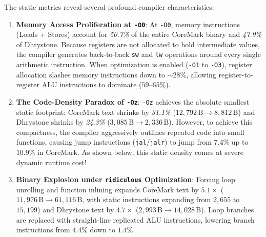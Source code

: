The static metrics reveal several profound compiler characteristics:
\begin{enumerate}
    \item \textbf{Memory Access Proliferation at \texttt{-O0}}:
    At \texttt{-O0}, memory instructions (Loads + Stores) account for \textit{50.7\%} of the entire CoreMark binary and \textit{47.9\%} of Dhrystone. Because registers are not allocated to hold intermediate values, the compiler generates back-to-back \texttt{sw} and \texttt{lw} operations around every single arithmetic instruction. When optimization is enabled (\texttt{-O1} to \texttt{-O3}), register allocation slashes memory instructions down to $\sim 28\%$, allowing register-to-register ALU instructions to dominate ($59\text{--}65\%$).
    
    \item \textbf{The Code-Density Paradox of \texttt{-Oz}}:
    \texttt{-Oz} achieves the absolute smallest static footprint: CoreMark text shrinks by \textit{31.1\%} ($12,792\,\text{B} \to 8,812\,\text{B}$) and Dhrystone shrinks by \textit{24.3\%} ($3,085\,\text{B} \to 2,336\,\text{B}$). However, to achieve this compactness, the compiler aggressively outlines repeated code into small functions, causing jump instructions (\texttt{jal}/\texttt{jalr}) to jump from $7.4\%$ up to $10.9\%$ in CoreMark. As shown below, this static density comes at severe dynamic runtime cost!
    
    \item \textbf{Binary Explosion under \texttt{ridiculous} Optimization}:
    Forcing loop unrolling and function inlining expands CoreMark text by \textit{$5.1\times$} ($11,976\,\text{B} \to 61,116\,\text{B}$, with static instructions expanding from $2,655$ to $15,199$) and Dhrystone text by \textit{$4.7\times$} ($2,993\,\text{B} \to 14,028\,\text{B}$). Loop branches are replaced with straight-line replicated ALU instructions, lowering branch instructions from $4.4\%$ down to $1.4\%$.
\end{enumerate}

